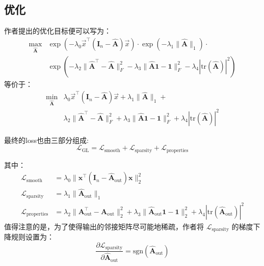\documentclass[color=gray,base=hide,cn]{elegantbook}
\begin{document}
\subsection{优化}
作者提出的优化目标便可以写为：
\begin{equation}
\begin{aligned}
\max_{\mathbf{\hat{A}}} & \exp\left(-\lambda_0 \vec{x}^\top(\mathbf{I}_n - \mathbf{\hat{A}}) \vec{x} \right) \cdot \exp\left( -\lambda_1 \| \mathbf{\hat{A}} \|_1 \right) \cdot \\ &  \exp \left( -\lambda_2 \| \mathbf{\hat{A}}^\top - \mathbf{\hat{A}} \|_F^2 -\lambda_3 \| \mathbf{\hat{A}}\mathbf{1} - \mathbf{1} \|_F^2 -\lambda_4 | \text{tr}(\mathbf{\hat{A}}) |^2 \right) 
\end{aligned}
\end{equation}
等价于：
\begin{equation}
\begin{aligned}
\min_{\mathbf{\hat{A}}} & \lambda_0 \vec{x}^\top(\mathbf{I}_n - \mathbf{\hat{A}}) \vec{x} + \lambda_1 \| \mathbf{\hat{A}} \|_1 + \\ & \lambda_2 \| \mathbf{\hat{A}}^\top - \mathbf{\hat{A}} \|_F^2  + \lambda_3 \| \mathbf{\hat{A}}\mathbf{1} - \mathbf{1} \|_F^2 + \lambda_4 | \text{tr}(\mathbf{\hat{A}}) |^2
\end{aligned}
\end{equation}

最终的loss也由三部分组成:
\begin{equation}
\mathcal{L}_\text{GL} = \mathcal{L}_\text{smooth} + \mathcal{L}_\text{sparsity} + \mathcal{L}_\text{properties}
\end{equation}

其中：
\begin{align}
 \mathcal{L}_\text{smooth}  & =  \lambda_0 \| \mathbf{x}^\top (\mathbf{I}_n - \mathbf{\hat{A}}_\text{out}) \mathbf{x} \|_2^2 \\
\mathcal{L}_\text{sparsity} & =   \lambda_1 \| \mathbf{\hat{A}}_\text{out} \|_1 \\
\mathcal{L}_\text{properties} & =   \lambda_2 \| \mathbf{A}_\text{out}^\top - \mathbf{A}_\text{out} \|_2^2 +   \lambda_3 \| \mathbf{\hat{A}}_\text{out} \mathbf{1} - \mathbf{1} \|_2^2 + \lambda_4 | \text{tr}(\mathbf{\hat{A}}_\text{out}) |^2
\end{align}
值得注意的是，为了使得输出的邻接矩阵尽可能地稀疏，作者将 $\mathcal{L}_\text{sparsity}$ 的梯度下降规则设置为：
\begin{equation}
\frac{\partial \mathcal{L}_\text{sparsity}}{\partial \mathbf{\hat{A}}_\text{out}} = \text{sgn}(\mathbf{\hat{A}}_\text{out})
\end{equation}
\end{document}
